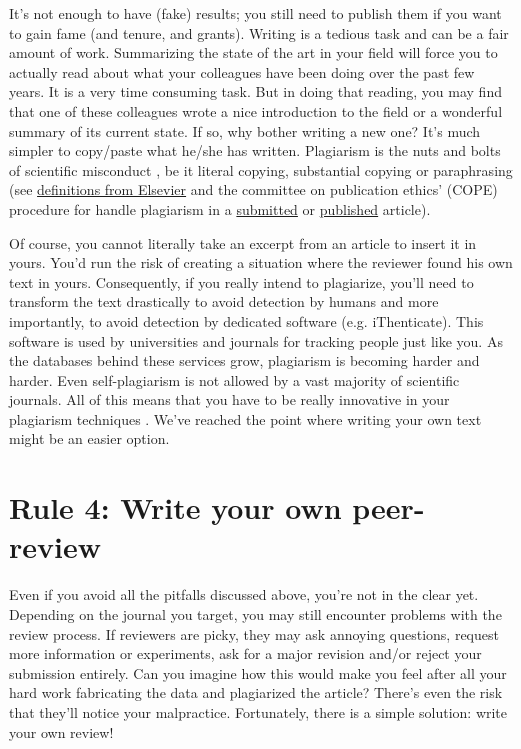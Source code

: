 \documentclass[a4paper,10pt,onecolumn]{article}
\begin{document}
It's not enough to have (fake) results; you still need to publish them if you want to gain fame (and tenure, and grants). Writing is a tedious task
and can be a fair amount of work. Summarizing the state of the art in your
field will force you to actually read about what your colleagues have been doing
over the past few years. It is a very time consuming task. But in doing that reading, you may find that one of these
colleagues wrote a nice introduction to the field or a wonderful summary of its current state. If so, why bother writing a new one? It's much simpler to copy/paste what he/she has written.  Plagiarism is the nuts and bolts of scientific misconduct
\citep{neuroskeptic:2017}, be it literal copying, substantial copying or
paraphrasing (see
\href{https://www.elsevier.com/editors/perk/plagiarism-complaints}{definitions
  from Elsevier} and the committee on publication ethics' (COPE) procedure for
handle plagiarism in a
\href{https://www.elsevier.com/__data/assets/pdf_file/0005/72815/plagiarism-A.pdf}{submitted}
or
\href{https://www.elsevier.com/__data/assets/pdf_file/0020/72830/plagiarism-B_0.pdf}{published}
article). 

Of course, you cannot literally take an excerpt from an
article to insert it in yours. You'd run the risk of creating a situation where the reviewer found his own text in yours. Consequently, if you
really intend to plagiarize, you'll need to transform the text drastically to
avoid detection by humans \citep{dorigo:2015,} and more importantly, to avoid
detection by dedicated software (e.g. iThenticate). This software is used by
universities and journals for tracking people just like you. As the databases behind these services grow, plagiarism is becoming harder and harder. Even
self-plagiarism is not allowed by a vast majority of scientific journals. All of this means that you have to be really innovative in your plagiarism techniques \citep{long:2009}. We've reached the point where writing your own text might be an easier option.

\section*{Rule 4: Write your own peer-review}

Even if you avoid all the pitfalls discussed above, you're not in the clear yet. Depending on the
journal you target, you may still encounter problems with the review
process. If reviewers are picky, they may ask annoying questions,
request more information or experiments, ask for a major revision and/or reject your submission entirely. Can you imagine how this would make you feel after all your hard work
fabricating the data and plagiarized the article? There's even the risk that they'll notice your malpractice. Fortunately, there is a simple solution: write your
own review! 
\end{document}
